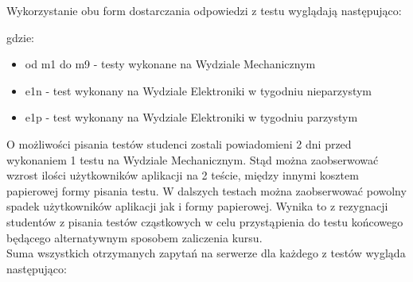 \documentclass[eng]{mgr}
\begin{document}
		Wykorzystanie obu form dostarczania odpowiedzi z testu wyglądają następująco:
			
		\begin{center}
		\end{center}
	
		gdzie:
		\begin{itemize}
			\item od m1 do m9 - testy wykonane na Wydziale Mechanicznym
			\item e1n - test wykonany na Wydziale Elektroniki w tygodniu nieparzystym
			\item e1p - test wykonany na Wydziale Elektroniki w tygodniu parzystym
		\end{itemize}
	
		O możliwości pisania testów studenci zostali powiadomieni 2 dni przed wykonaniem 1 testu na Wydziale Mechanicznym. Stąd można zaobserwować wzrost ilości użytkowników aplikacji na 2 teście, między innymi kosztem papierowej formy pisania testu. W dalszych testach można zaobserwować powolny spadek użytkowników aplikacji jak i formy papierowej. Wynika to z rezygnacji studentów z pisania testów cząstkowych w celu przystąpienia do testu końcowego będącego alternatywnym sposobem zaliczenia kursu.\\
	
		Suma wszystkich otrzymanych zapytań na serwerze dla każdego z testów wygląda następująco:
		
\end{document}
